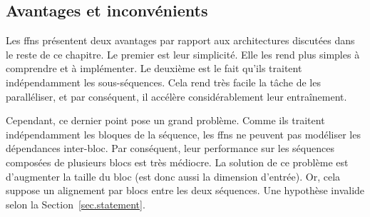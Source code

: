 \subsection{Avantages et inconvénients}

Les \glspl{ffn} présentent deux avantages par rapport aux architectures discutées dans le reste de ce chapitre.
Le premier est leur simplicité. 
Elle les rend plus simples à comprendre et à implémenter.
Le deuxième est le fait qu'ils traitent indépendamment les sous-séquences.
Cela rend très facile la tâche de les paralléliser, 
et par conséquent, il accélère considérablement leur entraînement.

Cependant, ce dernier point pose un grand problème.
Comme ils traitent indépendamment les bloques de la séquence, 
les \glspl{ffn} ne peuvent pas modéliser les dépendances inter-bloc.
Par conséquent, leur performance sur les séquences composées de plusieurs blocs est très médiocre.
La solution de ce problème est d'augmenter la taille du bloc (est donc aussi la dimension d'entrée).
Or, cela suppose un alignement par blocs entre les deux séquences.
Une hypothèse invalide selon la Section~\ref{sec.statement}.